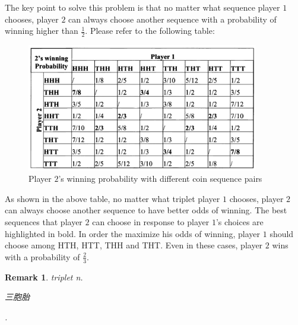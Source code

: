 \documentclass[12pt,letterpaper, onecolumn]{exam}
\newtheorem{remark}{Remark}
\begin{document}
\begin{questions}
\begin{solution}
\begin{parts}
            \quad The key point to solve this problem is that no matter what sequence player $1$ chooses, player $2$ can always choose another sequence with a probability of winning higher than $\frac{1}{2}$. Please refer to the following table:
            \begin{figure}[H]
                \centering
                \includegraphics[width=0.9\textwidth]{figures/fig-8.png}\caption{Player $2$'s winning probability with different coin sequence pairs}
            \end{figure}
            \quad As shown in the above table, no matter what triplet player $1$ chooses, player $2$ can always choose another sequence to have better odds of winning. The best sequences that player $2$ can choose in response to player $1$'s choices are highlighted in bold. In order the maximize his odds of winning, player $1$ should choose among HTH, HTT, THH and THT. Even in these cases, player $2$ wins with a probability of $\frac{2}{3}$.
            \end{parts}
        \end{solution}
        \begin{remark}
            triplet  n. \begin{CJK}{UTF8}{gbsn}三胞胎\end{CJK}.
        \end{remark}
    \end{questions}
\end{document}

